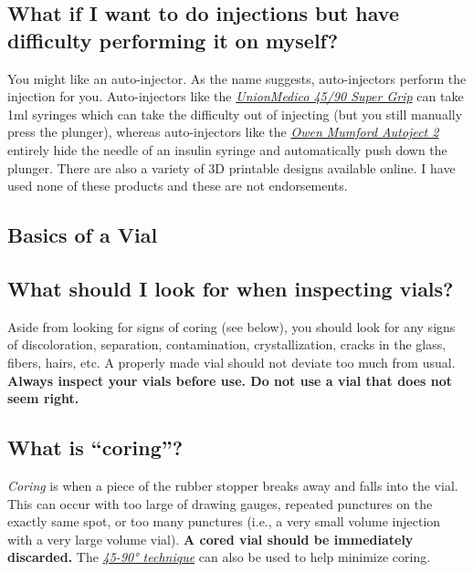 \documentclass{article}
\begin{document}
\subsection{What if I want to do injections but have difficulty performing it on myself?}\label{5-21}

You might like an auto-injector. As the name suggests, auto-injectors perform the injection for you. Auto-injectors like the \href{https://unionmedico.com/90-super-grip/}{\textit{UnionMedico 45/90 Super Grip}} can take 1ml syringes which can take the difficulty out of injecting (but you still manually press the plunger), whereas auto-injectors like the \href{https://www.youtube.com/watch?v=hPbhEpUN43Y}{\textit{Owen Mumford Autoject 2}} entirely hide the needle of an insulin syringe and automatically push down the plunger. There are also a variety of 3D printable designs available online. I have used none of these products and these are not endorsements.

\subsection*{Basics of a Vial}

\subsection{What should I look for when inspecting vials?}

Aside from looking for signs of coring (see below), you should look for any signs of discoloration, separation, contamination, crystallization, cracks in the glass, fibers, hairs, etc. A properly made vial should not deviate too much from usual. \textbf{Always inspect your vials before use. Do not use a vial that does not seem right.}

\subsection{What is “coring”?}\label{5-23}

\textit{Coring} is when a piece of the rubber stopper breaks away and falls into the vial. This can occur with too large of drawing gauges, repeated punctures on the exactly same spot, or too many punctures (i.e., a very small volume injection with a very large volume vial). \textbf{A cored vial should be immediately discarded.} The \href{https://www.youtube.com/watch?v=w5F0SLoMjC8}{\textit{45-90° technique}} can also be used to help minimize coring.
\end{document}
